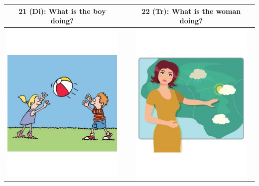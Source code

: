 \documentclass[12pt,notitlepage]{article}
\begin{document}
\begin{center}
\begin{tabular}{|c|c|c|}
\hline
21 (Di): What is the boy doing? && 22 (Tr): What is the woman doing? \\
\hline
\includegraphics[width=16em,trim=0 0 0 -3]{figures/I21.jpg} & & \includegraphics[width=16em,trim=0 0 0 -3]{figures/I22.jpg} \\
\hline
\end{tabular}
\vspace{1em} \\



\end{center}
\end{document}

